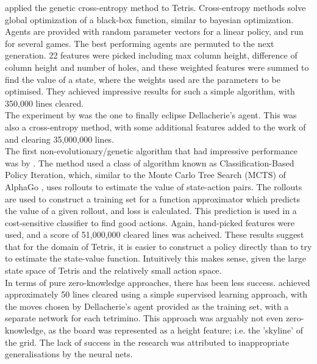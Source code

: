 \documentclass[12pt]{article}
\begin{document}
\textcite{szita2006learning} applied the genetic cross-entropy method to Tetris. Cross-entropy methods solve global optimization of a black-box function, similar to bayesian optimization. Agents are provided with random parameter vectors for a linear policy, and run for several games. The best performing agents are permuted to the next generation. 22 features were picked including max column height, difference of column height and number of holes, and these weighted features were summed to find the value of a state, where the weights used are the parameters to be optimised. They achieved impressive results for such a simple algorithm, with 350,000 lines cleared. \\\newline
The experiment by \textcite{thiery2009improvements} was the one to finally eclipse Dellacherie's agent. This was also a cross-entropy method, with some additional features added to the work of \textcite{szita2006learning} and clearing 35,000,000 lines.\\\newline
The first non-evolutionary/genetic algorithm that had impressive performance was by \textcite{NIPS2013_7504adad}. The method used a class of algorithm known as Classification-Based Policy Iteration, which, similar to the Monte Carlo Tree Search (MCTS) of AlphaGo \autocite{Silver2016}, uses rollouts to estimate the value of state-action pairs. The rollouts are used to construct a training set for a function approximator which predicts the value of a given rollout, and loss is calculated. This prediction is used in a cost-sensitive classifier to find good actions. Again, hand-picked features were used, and a score of 51,000,000 cleared lines was acheived. These results suggest that for the domain of Tetris, it is easier to construct a policy directly than to try to estimate the state-value function. Intuitively this makes sense, given the large state space of Tetris and the relatively small action space.\\\newline
In terms of pure zero-knowledge approaches, there has been less success. \textcite{lewis2015generalisation} achieved approximately 50 lines cleared using a simple supervised learning approach, with the moves chosen by Dellacherie's agent provided as the training set, with a separate network for each tetrimino. This approach was arguably not even zero-knowledge, as the board was represented as a height feature; i.e. the 'skyline' of the grid. The lack of success in the research was attributed to inappropriate generalisations by the neural nets.\\\newline
\end{document}
